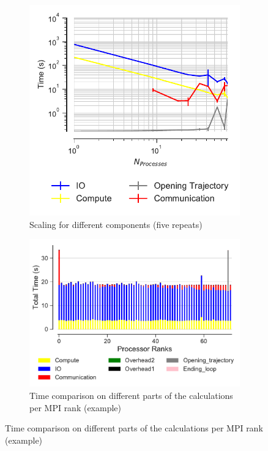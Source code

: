\begin{figure}[ht!]
\begin{subfigure}{.4\textwidth}
  \includegraphics[width=\linewidth]{figures/main-RMSD-time_comp_IO_comparison-Bridges.pdf}
  \captionsetup{format=hang}
\caption{Scaling for different components (five repeats)}
\label{fig:ScalingComputeIO-Bridges}
\end{subfigure}
\hfill
\begin{subfigure} {.5\textwidth}
  \includegraphics[width=\linewidth]{figures/main-RMSD-BarPlot-rank-comparison_72_4-Bridges.pdf}
  \captionsetup{format=hang}
  \caption{Time comparison on different parts of the calculations per MPI rank (example)}
  \label{fig:MPIranks-Bridges}
\end{subfigure}


\end{figure}

